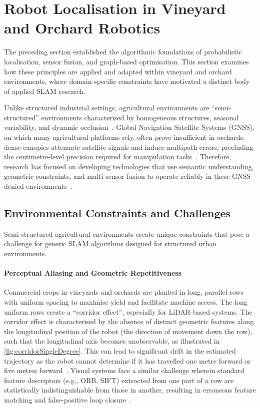 \section{Robot Localisation in Vineyard and Orchard Robotics}
\label{sec:vineyard-robotics}

The preceding section established the algorithmic foundations of probabilistic localisation, sensor fusion, and graph-based optimisation. This section examines how these principles are applied and adapted within vineyard and orchard environments, where domain-specific constraints have motivated a distinct body of applied SLAM research.

Unlike structured industrial settings, agricultural environments are ``semi-structured'' environments characterised by homogeneous structures, seasonal variability, and dynamic occlusion~\cite{hroobBenchmarkVisual3D2021}. Global Navigation Satellite Systems (GNSS), on which many agricultural platforms rely, often prove insufficient in orchards: dense canopies attenuate satellite signals and induce multipath errors, precluding the centimetre-level precision required for manipulation tasks~\cite{tangFruitTreeMappingSystem2024}. Therefore, research has focused on developing technologies that use semantic understanding, geometric constraints, and multi-sensor fusion to operate reliably in these GNSS-denied environments~\cite{tangFruitTreeMappingSystem2024}.

\subsection{Environmental Constraints and Challenges}
\label{subsec:env-constraints}
Semi-structured agricultural environments create unique constraints that pose a challenge for generic SLAM algorithms designed for structured urban environments. 

\paragraph{Perceptual Aliasing and Geometric Repetitiveness}

Commercial crops in vineyards and orchards are planted in long, parallel rows with uniform spacing to maximise yield and facilitate machine access. The long uniform rows create a ``corridor effect'', especially for LiDAR-based systems. The corridor effect is characterised by the absence of distinct geometric features along the longitudinal position of the robot (the direction of movement down the row), such that the longitudinal axis becomes unobservable, as illustrated in \cref{fig:corridorSingleDegree}. This can lead to significant drift in the estimated trajectory as the robot cannot determine if it has travelled one metre forward or five metres forward~\cite{khanReviewSLAMTechniques2025}. Visual systems face a similar challenge wherein standard feature descriptors (e.g., ORB, SIFT) extracted from one part of a row are statistically indistinguishable from those in another, resulting in erroneous feature matching and false-positive loop closure~\cite{papadimitriouLoopClosureDetection2022}.


